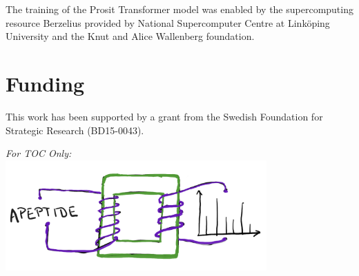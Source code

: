 \documentclass[10pt,a4paper]{article}
\begin{document}
The training of the Prosit Transformer model was enabled by the supercomputing resource Berzelius provided by National Supercomputer Centre at Linköping University and the Knut and Alice Wallenberg foundation.

\section*{Funding}

This work has been supported by a grant from the Swedish Foundation for Strategic Research (BD15-0043).





\newpage
{\em For TOC Only:}\\[2em]
\centering
    \includegraphics[width=10cm]{./img/transform.png}
\end{document}
